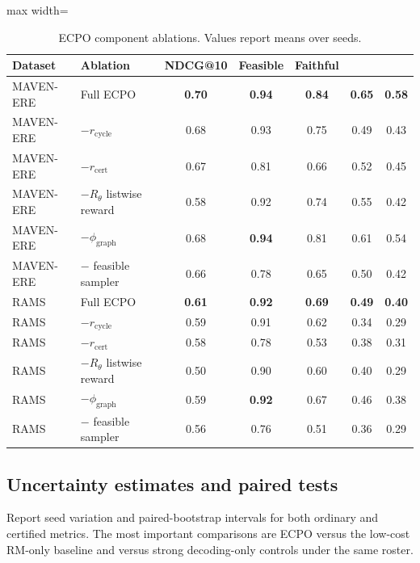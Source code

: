 \documentclass{article}
\begin{document}
\begin{table}[h]
\centering
\caption{ECPO component ablations. Values report means over seeds.}
\label{tab:ecpo_ablations_appendix}
\small
\begin{adjustbox}{max width=\linewidth}
\begin{tabular}{l l c c c c c}
\toprule
Dataset & Ablation & NDCG@10 & Feasible & Faithful & \EvidCons@10 & \CertNDCG@10 \\
\midrule
MAVEN-ERE & Full ECPO & \textbf{0.70} & \textbf{0.94} & \textbf{0.84} & \textbf{0.65} & \textbf{0.58} \\
MAVEN-ERE & $-r_{\mathrm{cycle}}$ & 0.68 & 0.93 & 0.75 & 0.49 & 0.43 \\
MAVEN-ERE & $-r_{\mathrm{cert}}$ & 0.67 & 0.81 & 0.66 & 0.52 & 0.45 \\
MAVEN-ERE & $-R_\theta$ listwise reward & 0.58 & 0.92 & 0.74 & 0.55 & 0.42 \\
MAVEN-ERE & $-\phi_{\mathrm{graph}}$ & 0.68 & \textbf{0.94} & 0.81 & 0.61 & 0.54 \\
MAVEN-ERE & $-$ feasible sampler & 0.66 & 0.78 & 0.65 & 0.50 & 0.42 \\
\midrule
RAMS & Full ECPO & \textbf{0.61} & \textbf{0.92} & \textbf{0.69} & \textbf{0.49} & \textbf{0.40} \\
RAMS & $-r_{\mathrm{cycle}}$ & 0.59 & 0.91 & 0.62 & 0.34 & 0.29 \\
RAMS & $-r_{\mathrm{cert}}$ & 0.58 & 0.78 & 0.53 & 0.38 & 0.31 \\
RAMS & $-R_\theta$ listwise reward & 0.50 & 0.90 & 0.60 & 0.40 & 0.29 \\
RAMS & $-\phi_{\mathrm{graph}}$ & 0.59 & \textbf{0.92} & 0.67 & 0.46 & 0.38 \\
RAMS & $-$ feasible sampler & 0.56 & 0.76 & 0.51 & 0.36 & 0.29 \\
\bottomrule
\end{tabular}
\end{adjustbox}
\end{table}

\subsection{Uncertainty estimates and paired tests}
\label{sec:app_uncertainty}

Report seed variation and paired-bootstrap intervals for both ordinary and certified metrics. The most important comparisons are ECPO versus the low-cost RM-only baseline and versus strong decoding-only controls under the same roster.
\end{document}
